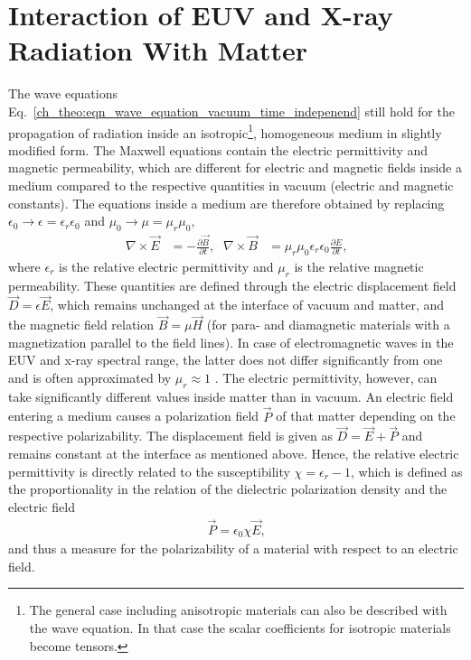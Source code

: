 \section{Interaction of EUV and X-ray Radiation With Matter} \label{ch_theo:sec_interaction}
The wave equations Eq.~\eqref{ch_theo:eqn_wave_equation_vacuum_time_indepenend} still hold for the propagation of radiation inside an isotropic\footnote{The general case including anisotropic materials can also be described with the wave equation. In that case the scalar coefficients for isotropic materials become tensors.}, homogeneous medium in slightly modified form. The Maxwell equations contain the electric permittivity and magnetic permeability, which are different for electric and magnetic fields inside a medium compared to the respective quantities in vacuum (electric and magnetic constants). The equations inside a medium are therefore obtained by replacing $\epsilon_0 \rightarrow \epsilon = \epsilon_r \epsilon_0$ and $\mu_0 \rightarrow \mu = \mu_r \mu_0$,
\begin{align}
 \nabla \times \vec{E} & = -\frac{\partial \vec{B}}{\partial t}\text{,} & \nabla \times \vec{B} &= \mu_r \mu_0 \epsilon_r \epsilon_0 \frac{\partial E}{\partial t} \text{,}
\end{align}
where $\epsilon_r$ is the relative electric permittivity and $\mu_r$ is the relative magnetic permeability. These quantities are defined through the electric displacement field $\vec{D} = \epsilon \vec{E}$, which remains unchanged at the interface of vacuum and matter, and the magnetic field relation $\vec{B} = \mu \vec{H}$ (for para- and diamagnetic materials with a magnetization parallel to the field lines).  In case of electromagnetic waves in the EUV and x-ray spectral range, the latter does not differ significantly from one and is often approximated by $\mu_r \approx 1$ \cite{bergevin_interaction_2009}. The electric permittivity, however, can take significantly different values inside matter than in vacuum. An electric field entering a medium causes a polarization field $\vec{P}$ of that matter depending on the respective polarizability. The displacement field is given as $\vec{D} = \vec{E} + \vec{P}$ and remains constant at the interface as mentioned above. Hence, the relative electric permittivity is directly related to the susceptibility $\chi = \epsilon_r - 1$, which is defined as the proportionality in the relation of the dielectric polarization density and the electric field
\begin{align}
 \vec{P} = \epsilon_0 \chi \vec{E}\text{,}
\end{align}
and thus a measure for the polarizability of a material with respect to an electric field.

